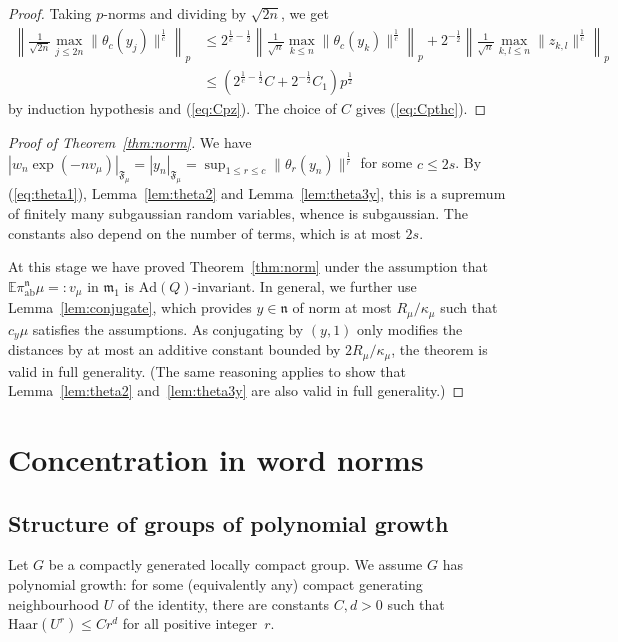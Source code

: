 \documentclass[11pt,leqno]{article}
\theoremstyle{plain}
\theoremstyle{definition}
\theoremstyle{remark}
\numberwithin{equation}{section}
\begin{document}
\begin{proof}
Taking $p$-norms and dividing by $\sqrt{2n}$, we get
\begin{align*}
\left\| \frac{1}{\sqrt{2n}}\max_{j\le 2n}\|\theta_c(y_j)\|^{\frac{1}{c}}\right\|_p & \le 2^{\frac{1}{c}-\frac{1}{2}}\left\| \frac{1}{\sqrt{n}}\max_{k\le n}\|\theta_c(y_k)\|^{\frac{1}{c}}\right\|_p+2^{-\frac{1}{2}}\left\|\frac{1}{\sqrt{n}}\max_{k,l\le n}\|z_{k,l}\|^{\frac{1}{c}}\right\|_p 
\\
& \le \left( 2^{\frac{1}{c}-\frac{1}{2}}C+2^{-\frac{1}{2}}C_1\right)p^{\frac{1}{2}} 
\end{align*}
by induction hypothesis and (\ref{eq:Cpz}). The choice of $C$ gives (\ref{eq:Cpthc}).
\end{proof}

\begin{proof}[Proof of Theorem~\ref{thm:norm}]
We have $\left|w_n\exp\left(-nv_{\mu}\right)\right|_{\mathfrak{F}_\mu}=|y_n|_{\mathfrak{F}_\mu}=\sup_{1\le r \le c} \|\theta_r(y_n)\|^{\frac{1}{r}}$ for some $c\le 2s$.  By (\ref{eq:theta1}), Lemma~\ref{lem:theta2} and Lemma~\ref{lem:theta3y}, this is a supremum of finitely many subgaussian random variables, whence is subgaussian. The constants  also depend on the number of terms, which is at most $2s$. 

At this stage we have proved Theorem~\ref{thm:norm} under the assumption that $\mathbb{E}\pi_{\mathrm{ab}}^{\mathfrak{n}}\mu=:v_\mu$ in $\mathfrak{m}_1$ is $\mathrm{Ad}(Q)$-invariant. In general, we further use Lemma~\ref{lem:conjugate}, which provides $y\in \mathfrak{n}$ of norm at most $R_\mu/\kappa_\mu$ such that $c_y\mu$ satisfies the assumptions. As conjugating by $(y,1)$ only modifies the distances by at most an additive constant bounded by $2R_\mu/\kappa_\mu$, the theorem is valid in full generality. (The same reasoning applies to show that Lemma~\ref{lem:theta2} and~\ref{lem:theta3y} are also valid in full generality.)
\end{proof}


\section{Concentration in word norms}



\subsection{Structure of groups of polynomial growth}

Let $G$ be a compactly generated locally compact group. We assume $G$ has polynomial growth: for some (equivalently any) compact generating neighbourhood $U$ of the identity, there are constants $C,d>0$ such that $\mathrm{Haar}(U^r) \le Cr^d$ for all positive integer~$r$.
\end{document}
